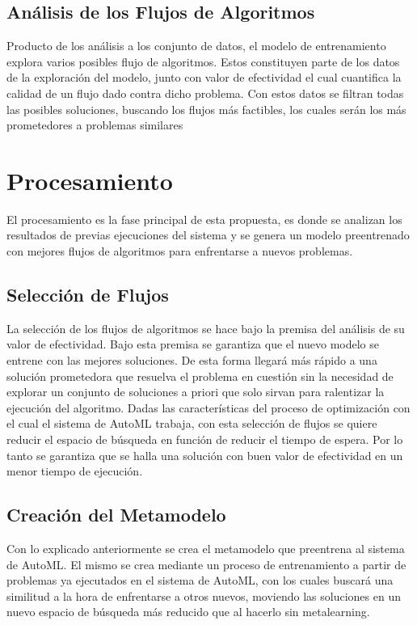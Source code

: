 \subsection{Análisis de los Flujos de Algoritmos}

Producto de los análisis a los conjunto de datos, el modelo de entrenamiento
explora varios posibles flujo de algoritmos. Estos constituyen parte de los
datos de la exploración del modelo, junto con valor de efectividad el cual
cuantifica la calidad de un flujo dado contra dicho problema. Con estos datos
se filtran todas las posibles soluciones, buscando los flujos más factibles,
los cuales serán los más prometedores a problemas similares 


\section{Procesamiento}

El procesamiento es la fase principal de esta propuesta, es donde se analizan
los resultados de previas ejecuciones del sistema y se genera un modelo
preentrenado con mejores flujos de algoritmos para enfrentarse a nuevos
problemas.

\subsection{Selección de Flujos}

La selección de los flujos de algoritmos se hace bajo la premisa del análisis
de su valor de efectividad. Bajo esta premisa se garantiza que el nuevo modelo
se entrene con las mejores soluciones. De esta forma llegará más rápido a una
solución prometedora que resuelva el problema en cuestión sin la necesidad de
explorar un conjunto de soluciones a priori que solo sirvan para ralentizar la
ejecución del algoritmo. Dadas las características del proceso de optimización
con el cual el sistema de AutoML trabaja, con esta selección de flujos se
quiere reducir el espacio de búsqueda en función de reducir el tiempo de
espera. Por lo tanto se garantiza que se halla una solución con buen valor de
efectividad en un menor tiempo de ejecución.

\subsection{Creación del Metamodelo}

Con lo explicado anteriormente se crea el metamodelo que preentrena al sistema
de AutoML. El mismo se crea mediante un proceso de entrenamiento a partir de
problemas ya ejecutados en el sistema de AutoML, con los cuales buscará una
similitud a la hora de enfrentarse a otros nuevos, moviendo las soluciones en
un nuevo espacio de búsqueda más reducido que al hacerlo sin metalearning.

